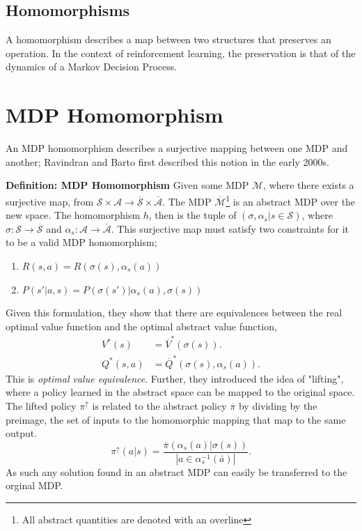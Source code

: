 \subsection{Homomorphisms}
A homomorphism describes a map between two structures that preserves an operation. In the context of reinforcement learning, the preservation is that of the dynamics of a Markov Decision Process.

\section{MDP Homomorphism}
An MDP homomorphism describes a surjective mapping between one MDP and another; Ravindran and Barto first described this notion in the early 2000s\cite{ravindran2003smdp,ravindran2001symmetries}.

\textbf{Definition: MDP Homomorphism} Given some MDP $\mathcal{M}$, where there exists a surjective map, from $\mathcal{S} \times \mathcal{A} \rightarrow \overline{\mathcal{S}} \times \overline{\mathcal{A}}$. The MDP $\overline{\mathcal{M}}$\footnote{All abstract quantities are denoted with an $\overline{\text{overline}}$} is an abstract MDP over the new space. The homomorphism $h$, then is the tuple of $(\sigma, \alpha_s|s \in \mathcal{S})$, where $\sigma: \mathcal{S} \rightarrow \overline{\mathcal{S}}$ and $\alpha_s : \mathcal{A} \rightarrow \overline{\mathcal{A}}$. This surjective map must satisfy two constraints for it to be a valid MDP homomorphism;
\begin{enumerate}
	\item $R(s, a) = R(\sigma(s), \alpha_s(a))$
	\item $P(s'| a, s) = P(\sigma(s')| \alpha_s(a), \sigma(s))$
\end{enumerate}

Given this formulation, they show that there are equivalences between the real optimal value function and the optimal abstract value function,
\begin{align*}
	V^*(s)    & = \overline{V}^*(\sigma(s)).              \\
	Q^*(s, a) & = \overline{Q}^*(\sigma(s), \alpha_s(a)).
\end{align*}
This is \textit{optimal value equivalence}. Further, they introduced the idea of "lifting", where a policy learned in the abstract space can be mapped to the original space. The lifted policy $\pi^\uparrow$ is related to the abstract policy $\overline{\pi}$ by dividing by the preimage, the set of inputs to the homomorphic mapping that map to the same output.
\begin{equation}
	\pi^\uparrow(a | s) = \frac{\overline{\pi}(\alpha_s(a) | \sigma(s))}{| a \in \alpha^{-1}_s(\bar{a})|}.
\end{equation}
As such any solution found in an abstract MDP can easily be transferred to the orginal MDP.
